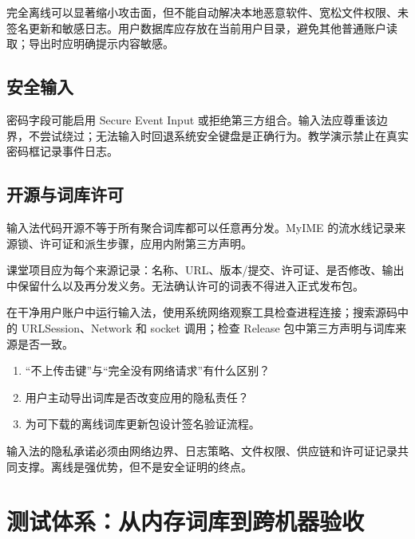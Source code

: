完全离线可以显著缩小攻击面，但不能自动解决本地恶意软件、宽松文件权限、未签名更新和敏感日志。用户数据库应存放在当前用户目录，避免其他普通账户读取；导出时应明确提示内容敏感。

\section{安全输入}

密码字段可能启用 Secure Event Input 或拒绝第三方组合。输入法应尊重该边界，不尝试绕过；无法输入时回退系统安全键盘是正确行为。教学演示禁止在真实密码框记录事件日志。

\section{开源与词库许可}

输入法代码开源不等于所有聚合词库都可以任意再分发。MyIME 的流水线记录来源锁、许可证和派生步骤，应用内附第三方声明。



课堂项目应为每个来源记录：名称、URL、版本/提交、许可证、是否修改、输出中保留什么以及再分发义务。无法确认许可的词表不得进入正式发布包。

\begin{lab}[离线审计]
在干净用户账户中运行输入法，使用系统网络观察工具检查进程连接；搜索源码中的 URLSession、Network 和 socket 调用；检查 Release 包中第三方声明与词库来源是否一致。
\end{lab}

\exercises
\begin{enumerate}
  \item “不上传击键”与“完全没有网络请求”有什么区别？
  \item 用户主动导出词库是否改变应用的隐私责任？
  \item 为可下载的离线词库更新包设计签名验证流程。
\end{enumerate}

\begin{summarybox}
输入法的隐私承诺必须由网络边界、日志策略、文件权限、供应链和许可证记录共同支撑。离线是强优势，但不是安全证明的终点。
\end{summarybox}


\chapter{测试体系：从内存词库到跨机器验收}

